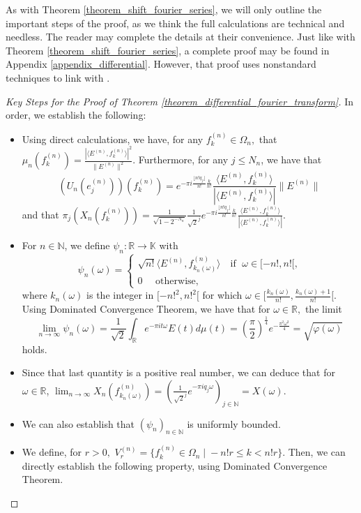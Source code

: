 \documentclass[10pt,a4paper]{amsart}
\def \LL{\langle}
\def \RR{\rangle}
\begin{document}
As with Theorem \ref{theorem_shift_fourier_series}, we will only outline the important steps of the proof, as we think the full calculations are technical and needless. The reader may complete the details at their convenience. Just like with Theorem \ref{theorem_shift_fourier_series}, a complete proof may be found in  Appendix \ref{appendix_differential}. However, that proof uses nonstandard techniques to link with \cite{nonez2024spectralequivalencesnonstandardsamplings}.

\begin{proof}[Key Steps for the Proof of Theorem \ref{theorem_differential_fourier_transform}]
	In order, we establish the following:
	\begin{itemize}
		\item Using direct calculations, we have, for any $f_k^{(n)}\in\Omega_n,$  that $\mu_n(f_k^{(n)})=\frac{|\LL E^{(n)}, f_k^{(n)}\RR|^2}{\|E^{(n)}\|^2}.$ Furthermore, for any $j\leq N_n$, we have that $$(U_n(e_j^{(n)}))(f_k^{(n)})=e^{-\pi i \frac{\lfloor n!q_j\rfloor}{n!}\frac{k}{n!}}\frac{\LL E^{(n)}, f_k^{(n)}\RR}{|\LL E^{(n)}, f_k^{(n)}\RR|}\|E^{(n)}\|$$ and that $\pi_j (X_n(f_k^{(n)}))=\frac{1}{\sqrt{1-2^{-N_n}}}\frac{1}{\sqrt{2}^j}e^{-\pi i \frac{\lfloor n!q_j\rfloor}{n!}\frac{k}{n!}}\frac{\LL E^{(n)}, f_k^{(n)}\RR}{|\LL E^{(n)}, f_k^{(n)}\RR|}.$
		\item For $n\in\mathbb{N}$, we define $\psi_n:\mathbb{R}\rightarrow\mathbb{K}$ with $$\psi_n(\omega)=\begin{cases}
			\sqrt{n!}\LL E^{(n)},f_{k_n(\omega)}^{(n)}\RR \quad \text{if $\;\omega\in[-n!,n![$,}\\
			0 \quad \text{ otherwise, }
		\end{cases}$$ where $k_n(\omega)$ is the integer in $[-n!^2,n!^2[$ for which $\omega\in[\frac{k_n(\omega)}{n!},\frac{k_n(\omega)+1}{n!}[.$ Using Dominated Convergence Theorem, we have that for $\omega\in\mathbb{R},$ the limit $$\lim_{n\rightarrow\infty}\psi_n(\omega)=\frac{1}{\sqrt{2}}\int_{\mathbb{R}}e^{-\pi i t\omega}E(t)d\mu(t)=\left(\frac{\pi}{2}\right)^{\frac{1}{4}}e^{-\frac{\pi^2\omega^2}{4}}=\sqrt{\varphi(\omega)}$$ holds. 
		\item Since that last quantity is a positive real number, we can deduce that for $\omega\in\mathbb{R}$, $\lim_{n\rightarrow\infty} X_n(f_{k_n(\omega)}^{(n)})=\left(\frac{1}{\sqrt{2}^j}e^{-\pi i q_j \omega}\right)_{j\in\mathbb{N}}=X(\omega).$ 
		\item We can also establish that $(\psi_n)_{n\in\mathbb{N}}$ is uniformly bounded.
		\item We define, for $r>0,$ $V_r^{(n)}=\{f_k^{(n)}\in \Omega_n\;|\; -n!r\leq k <n!r\}.$  Then, we can directly establish the following property, using Dominated Convergence Theorem.

\end{itemize}
\end{proof}
\end{document}
